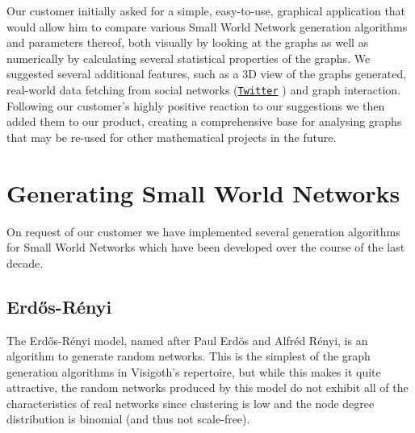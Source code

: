 \documentclass[a4paper,11pt,titlepage]{article}
\let\stdhref\href
\renewcommand{\href}[2]{\stdhref{#1}{\texttt{#2}}}
\let\stdsection\section         %
\renewcommand{\section}{\newpage\stdsection}
\newcommand{\Twitter}{\href{http://twitter.com}{Twitter} }
\begin{document}
%
%

Our customer initially asked for a simple, easy-to-use, graphical
application that would allow him to compare various Small World
Network generation algorithms and parameters thereof, both visually
by looking at the graphs as well as numerically by calculating
several statistical properties of the graphs.
We suggested several additional features, such as a 3D view of the
graphs generated, real-world data fetching from social networks
(\Twitter) and graph interaction. Following our customer's highly
positive reaction to our suggestions we then added them to our
product, creating a comprehensive base for analysing graphs that
may be re-used for other mathematical projects in the future.




\section{Generating Small World Networks}
\label{smallworldnetworks}

On request of our customer we have implemented several generation
algorithms for Small World Networks which have been developed over
the course of the last decade.


\subsection{Erd\H{o}s-R\'{e}nyi}
The Erd\H{o}s-R\'{e}nyi model, named after Paul Erd\"{o}s and
Alfr\'{e}d R\'{e}nyi, is an algorithm to generate random networks.
This is the simplest of the graph generation algorithms in Visigoth's
repertoire, but while this makes it quite attractive,
the random networks produced by this model do not exhibit all of
the characteristics of real networks since clustering is low and
the node degree distribution is binomial (and thus not scale-free).
\end{document}
